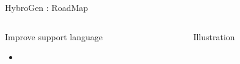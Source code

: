 \begin{Frame}{HybroGen : RoadMap}
 \begin{columns}[t]
  \begin{column}{\BW}
    \begin{block}{Improve support language}
      \begin{itemize}
        \item
      \end{itemize}
    \end{block}
  \end{column}
  \begin{column}{\BW}
    \begin{block}{Illustration}
    \end{block}
  \end{column}

 \end{columns}
\end{Frame}
